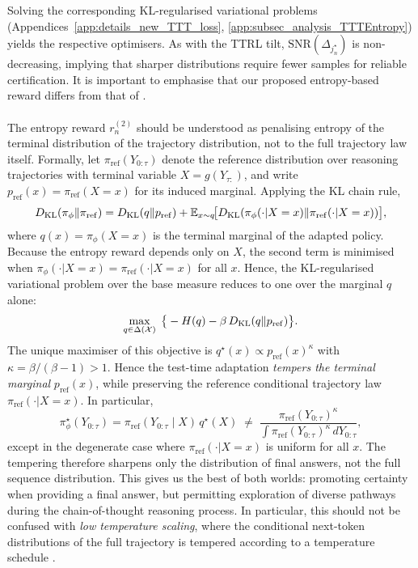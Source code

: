 Solving the corresponding KL-regularised variational problems (Appendices~\ref{app:details_new_TTT_loss}, \ref{app:subsec_analysis_TTTEntropy})
yields the respective optimisers.  
As with the TTRL tilt, \(\mathrm{SNR}(\Delta_{j^\star_n})\) is non-decreasing, implying that
sharper distributions require fewer samples for reliable certification.    
It is important to emphasise that our proposed entropy-based reward differs from that of \citep{agarwal2025unreasonableeffectivenessentropyminimization}. 
\\\\
The entropy reward $r_n^{(2)}$ should be understood as penalising entropy of the terminal distribution
of the trajectory distribution, not to the full trajectory law itself.
Formally, let $\pi_{\mathrm{ref}}(Y_{0:\tau})$ denote the reference
distribution over reasoning trajectories with terminal variable
$X=g(Y_{\tau:})$, and write
$p_{\mathrm{ref}}(x)=\pi_{\mathrm{ref}}(X=x)$ for its induced marginal.
Applying the KL chain rule,
\[
D_{\mathrm{KL}}(\pi_\phi\|\pi_{\mathrm{ref}})
=D_{\mathrm{KL}}(q\|p_{\mathrm{ref}})
+\mathbb{E}_{x\sim q}\!\big[D_{\mathrm{KL}}(\pi_\phi(\cdot|X=x)\|
   \pi_{\mathrm{ref}}(\cdot|X=x))\big],
\]
where $q(x)=\pi_\phi(X=x)$ is the terminal marginal of the adapted policy.
Because the entropy reward depends only on $X$, the second term is minimised
when $\pi_\phi(\cdot|X=x)=\pi_{\mathrm{ref}}(\cdot|X=x)$ for all $x$.  Hence, the KL-regularised variational problem over the base measure reduces to one over  the marginal $q$ alone:
\[
\max_{q\in\Delta(\mathcal X)} \;
   \big\{-H(q)-\beta \,D_{\mathrm{KL}}(q\|p_{\mathrm{ref}})\big\}.
\]
The unique maximiser of this objective is
$q^\star(x)\propto p_{\mathrm{ref}}(x)^{\kappa}$ with
$\kappa=\beta/(\beta-1)>1$.
Hence the test-time adaptation \emph{tempers the terminal marginal}
$p_{\mathrm{ref}}(x)$, while preserving the reference conditional trajectory
law $\pi_{\mathrm{ref}}(\cdot|X=x)$.  In particular,
\[
\pi_\phi^\star(Y_{0:\tau})
= \pi_{\mathrm{ref}}(Y_{0:\tau}\mid X)\,q^\star(X)
\;\neq\;
\frac{\pi_{\mathrm{ref}}(Y_{0:\tau})^{\kappa}}
     {\int \pi_{\mathrm{ref}}(Y_{0:\tau})^{\kappa}\,dY_{0:\tau}},
\]
except in the degenerate case where
$\pi_{\mathrm{ref}}(\cdot|X=x)$ is uniform for all $x$.
The tempering therefore sharpens only the distribution of final answers,
not the full sequence distribution.  This gives us the best of both worlds:  promoting certainty when providing a final answer, but permitting exploration of diverse pathways during the chain-of-thought reasoning process.  In particular, this should not be confused with \emph{low temperature scaling}, where the conditional next-token distributions of the full trajectory is tempered according to a temperature schedule \cite{wang2020contextual}.  
